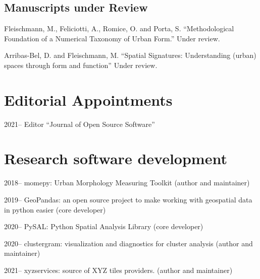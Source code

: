 \documentclass[12pt,a4paper]{report}
\begin{document}
    \subsection*{Manuscripts under Review}

    \begin{tablist}

        \item[\the\year] \tab{}Fleischmann, M., Feliciotti, A., Romice, O. and Porta, S. \enquote{Methodological Foundation of a Numerical Taxonomy of Urban Form.} Under review.

        \item[\the\year] \tab{}Arribas-Bel, D. and Fleischmann, M. \enquote{Spatial Signatures: Understanding (urban) spaces through form and function} Under review.

    \end{tablist}

    \section*{Editorial Appointments}

    \begin{tablist}

        \item[2021--] \tab{}Editor \enquote{Journal of Open Source Software}

    \end{tablist}

    \section*{Research software development}

    \begin{tablist}

        \item[2018--] \tab{}momepy: Urban Morphology Measuring Toolkit (author and maintainer)
        \item[2019--] \tab{}GeoPandas: an open source project to make working with geospatial data in python easier (core developer)
        \item[2020--] \tab{}PySAL: Python Spatial Analysis Library (core developer)
        \item[2020--] \tab{}clustergram: visualization and diagnostics for cluster analysis (author and maintainer)
        \item[2021--] \tab{}xyzservices: source of XYZ tiles providers. (author and maintainer)

    \end{tablist}
\end{document}
